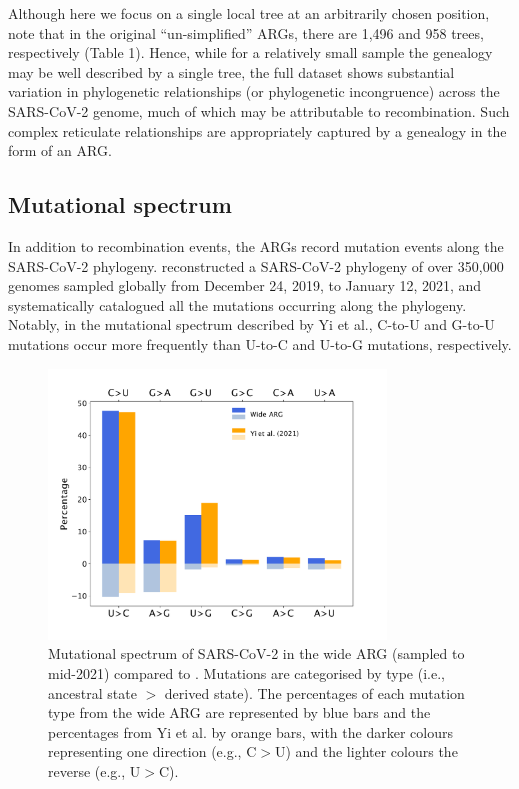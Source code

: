 \documentclass{article}
\begin{document}
Although here we focus on a single local tree at an arbitrarily chosen
position, note that in the original ``un-simplified'' ARGs, there are 1,496 and
958 trees, respectively (Table 1). Hence, while for a relatively small sample
the genealogy may be well described by a single tree, the full dataset shows
substantial variation in phylogenetic relationships (or phylogenetic
incongruence) across the SARS-CoV-2 genome, much of which may be attributable
to recombination. Such complex reticulate relationships are appropriately
captured by a genealogy in the form of an ARG.

\subsection{Mutational spectrum}

In addition to recombination events, the ARGs record mutation events along the
SARS-CoV-2 phylogeny. \cite{Yi2021-sc} reconstructed a SARS-CoV-2
phylogeny of over 350,000 genomes sampled globally from December 24, 2019, to
January 12, 2021, and systematically catalogued all the mutations occurring
along the phylogeny. Notably, in the mutational spectrum described by Yi et
al., C-to-U and G-to-U mutations occur more frequently than U-to-C and U-to-G
mutations, respectively.

\begin{figure}
\centering
\includegraphics[width=0.8\textwidth]{figures/mutational_spectra.pdf}
\caption{\label{fig:mutational_spectra}
Mutational spectrum of SARS-CoV-2 in
the wide ARG (sampled to mid-2021) compared to \cite{Yi2021-sc}.
Mutations are categorised by type (i.e., ancestral state $>$
derived state). The percentages of each mutation type from the wide ARG are
represented by blue bars and the percentages from Yi et al. by orange bars,
with the darker colours representing one direction (e.g., C$>$U) and the
lighter colours the reverse (e.g., U$>$C).}
\end{figure}
\end{document}
